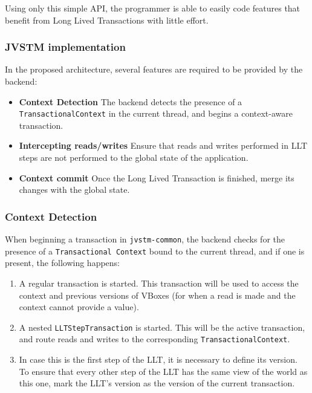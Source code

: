 \documentclass{llncs}
\begin{document}
Using only this simple API, the programmer is able to easily code
features that benefit from Long Lived Transactions with little effort.

\subsubsection{JVSTM implementation}

In the proposed architecture, several features are required to be
provided by the backend:

\begin{itemize}

\item {\bf Context Detection} The backend detects the presence of a
  \texttt{TransactionalContext} in the current thread, and begins a
  context-aware transaction.

\item {\bf Intercepting reads/writes} Ensure that reads and writes
  performed in LLT steps are not performed to the global state of the
  application.

\item {\bf Context commit} Once the Long Lived Transaction is
  finished, merge its changes with the global state.

\end{itemize}

\subsubsection{Context Detection}

When beginning a transaction in \texttt{jvstm-common}, the backend
checks for the presence of a \texttt{Transactional Context} bound to
the current thread, and if one is present, the following happens:

\begin{enumerate}

\item A regular transaction is started. This transaction will be used
  to access the context and previous versions of VBoxes (for when a
  read is made and the context cannot provide a value).

\item A nested \texttt{LLTStepTransaction} is started. This will be the
  active transaction, and route reads and writes to the corresponding
  \texttt{TransactionalContext}.

\item In case this is the first step of the LLT, it is necessary to
  define its version. To ensure that every other step of the LLT has
  the same view of the world as this one, mark the LLT's version as
  the version of the current transaction.

\end{enumerate}
\end{document}
